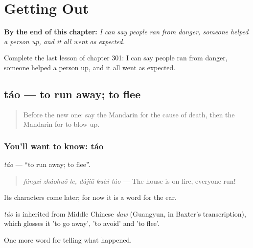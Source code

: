 
\chapter{Getting Out}
\label{ch:zh-getting-out}

\begin{chapteropening}
\textbf{By the end of this chapter:} \emph{I can say people ran from danger, someone helped a person up, and it all went as expected.}

Complete the last lesson of chapter 301: I can say people ran from danger, someone helped a person up, and it all went as expected.
\end{chapteropening}

\section[táo]{táo — to run away; to flee}

\label{lesson:ZH-C301-tao}



\begin{quote}
Before the new one: say the Mandarin for the cause of death, then the Mandarin for to blow up.
\end{quote}

\subsection*{You'll want to know: táo}
\emph{táo} — \textquotedblleft{}to run away; to flee\textquotedblright{}.

\begin{quote}
\emph{fángzi zháohuǒ le, dàjiā kuài táo} — The house is on fire, everyone run!
\end{quote}

Its characters come later; for now it is a word for the ear.

\begin{cousinweb}
\emph{táo} is inherited from Middle Chinese \emph{daw} (Guangyun, in Baxter's transcription), which glosses it 'to go away', 'to avoid' and 'to flee'.
\end{cousinweb}

\begin{grammarlens}[title={What you've built}]
One more word for telling what happened.
\end{grammarlens}

